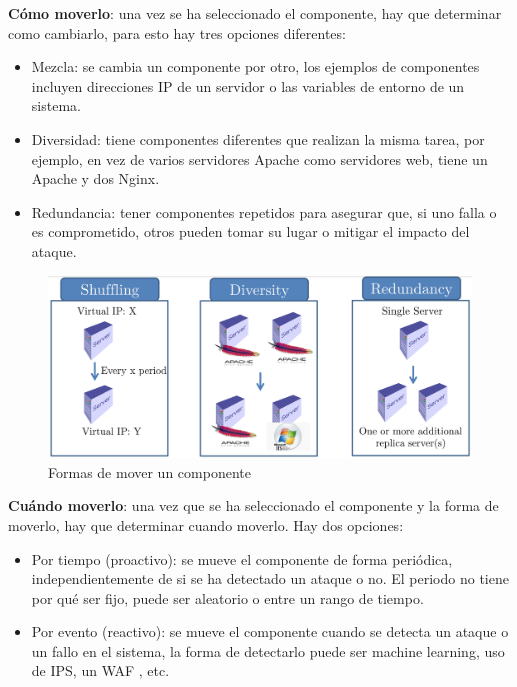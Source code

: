\textbf{Cómo moverlo}: una vez se ha seleccionado el componente, hay que determinar como cambiarlo, para esto hay tres opciones diferentes:
\begin{itemize}
    \item Mezcla: se cambia un componente por otro, los ejemplos de componentes incluyen direcciones IP de un servidor o las variables de entorno de un sistema.
    \item Diversidad: tiene componentes diferentes que realizan la misma tarea, por ejemplo, en vez de varios servidores Apache como servidores web, tiene un Apache y dos Nginx.
    \item Redundancia: tener componentes repetidos para asegurar que, si uno falla o es comprometido, otros pueden tomar su lugar o mitigar el impacto del ataque. 
\end{itemize}

\begin{figure}[h]
    \centering
        \includegraphics[width=\linewidth]{./imagenes/tiposmovimientos.png}
        \caption{Formas de mover un componente}
\end{figure}

\textbf{Cuándo moverlo}: una vez que se ha seleccionado el componente y la forma de moverlo, hay que determinar cuando moverlo. Hay dos opciones:
\begin{itemize}
    \item Por tiempo (proactivo): se mueve el componente de forma periódica, independientemente de si se ha detectado un ataque o no. El periodo no tiene por qué ser fijo, puede ser aleatorio o entre un rango de tiempo.
    \item Por evento (reactivo): se mueve el componente cuando se detecta un ataque o un fallo en el sistema, la forma de detectarlo puede ser machine learning\cite{MTD-ML}, uso de IPS\cite{Design-Generic-Intrusion-Tolerant-Architecture}, un WAF \cite{MTD-WAF}, etc.
\end{itemize}

